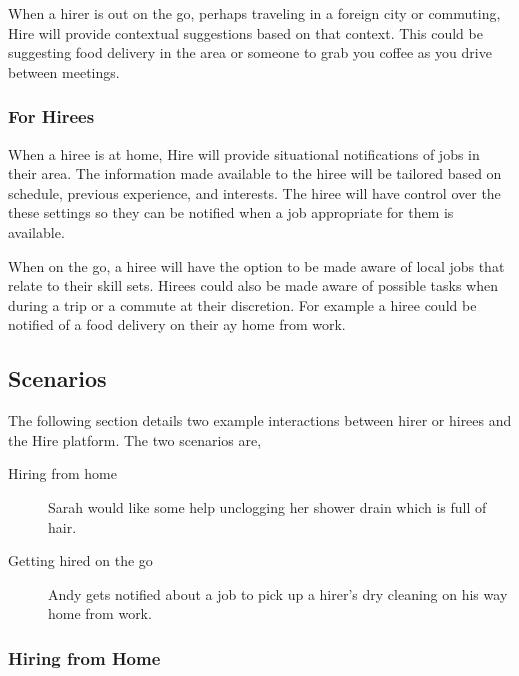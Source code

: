 \documentclass[11pt]{article}
\begin{document}
When a hirer is out on the go, perhaps traveling in a foreign city or commuting, Hire will provide contextual suggestions based on that context. This could be suggesting food delivery in the area or someone to grab you coffee as you drive between meetings.

\subsubsection{For Hirees}

When a hiree is at home, Hire will provide situational notifications of jobs in their area. The information made available to the hiree will be tailored based on schedule, previous experience, and interests. The hiree will have control over the these settings so they can be notified when a job appropriate for them is available.

When on the go, a hiree will have the option to be made aware of local jobs that relate to their skill sets. Hirees could also be made aware of possible tasks when during a trip or a commute at their discretion. For example a hiree could be notified of a food delivery on their ay home from work.

\subsection{Scenarios}

The following section details two example interactions between hirer or hirees and the Hire platform. The two scenarios are,

\begin{description}
    \item[Hiring from home] Sarah would like some help unclogging her shower drain which is full of hair.
    \item[Getting hired on the go] Andy gets notified about a job to pick up a hirer's dry cleaning on his way home from work.
\end{description}

\subsubsection{Hiring from Home}
\end{document}
